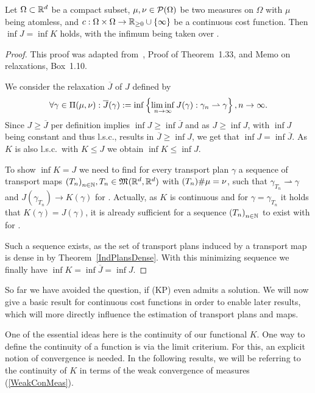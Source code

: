 \begin{theorem}\label{InfCoincide}
	Let $\Omega \subset \R^d$ be a compact subset, $\mu, \nu \in \PM{\Omega}$ be two measures on $\Omega$ with $\mu$ being atomless, and $\map[c]{\Omega \times \Omega}{\RZero \cup \{ \infty \}}$ be a continuous cost function. Then $\inf J = \inf K$ holds, with the infimum being taken over \TP{\mu}{\nu}.
\end{theorem}

\begin{proof}
	This proof was adapted from~\cite{San2015}, Proof of Theorem~1.33, and Memo on relaxations, Box~1.10.

	We consider the relaxation $\overline{J}$ of $J$ defined by
	\[ \forall \gamma \in \TP{\mu}{\nu}: \overline{J}(\gamma) := \inf \left\{ \liminf\limits_{\Ninf} J(\gamma) : \weak{\gamma_n}{\gamma} \right\}, \Ninf. \]
	Since $J \ge \overline{J}$ per definition implies $\inf J \ge \inf \overline{J}$ and as $J \ge \inf J$, with $\inf J$ being constant and thus l.s.c., results in $\overline{J} \ge \inf J$, we get that $\inf J = \inf \overline{J}$. As $K$ is also l.s.c.\ with $K \le J$ we obtain $\inf K \le \inf J$.

	To show $\inf K = J$ we need to find for every transport plan $\gamma$ a sequence of transport maps ${(T_n)}_{\NinN}, T_n \in \MF{\R^d}{\R^d}$ with $\push[(T_n)]{\mu} = \nu$, such that $\gamma_{T_n} \rightharpoonup \gamma$ and $J(\gamma_{T_n}) \rightarrow K(\gamma)$ for \Ninf. Actually, as $K$ is continuous and for $\gamma = \gamma_{T_n}$ it holds that $K(\gamma) = J(\gamma)$, it is already sufficient for a sequence ${(T_n)}_{\NinN}$ to exist with  for \Ninf.

	Such a sequence exists, as the set of transport plans induced by a transport map is dense in \TP{\mu}{\nu} by Theorem~\ref{IndPlansDense}. With this minimizing sequence we finally have $\inf K = \inf \overline{J} = \inf J$.
\end{proof}

So far we have avoided the question, if (KP) even admits a solution. We will now give a basic result for continuous cost functions in order to enable later results, which will more directly influence the estimation of transport plans and maps.

One of the essential ideas here is the continuity of our functional $K$. One way to define the continuity of a function is via the limit criterium. For this, an explicit notion of convergence is needed. In the following results, we will be referring to the continuity of $K$ in terms of the weak convergence of measures (\ref{WeakConMeas}).

